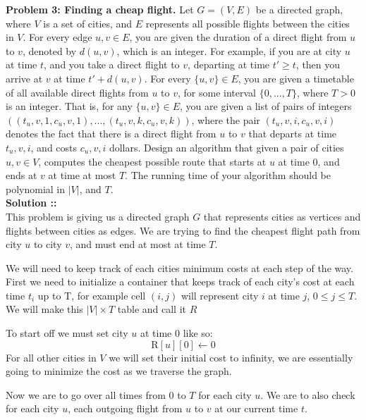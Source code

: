 \documentclass[11pt]{article}
\begin{document}
\pagebreak


\textbf{Problem 3: Finding a cheap flight.} Let $G = (V, E)$ be a directed graph, where
$V$ is a set of cities, and $E$ represents all possible flights between the cities in 
$V$. For every edge ${u, v} \in E$, you are given the duration of a direct flight from 
$u$ to $v$, denoted by $d(u, v)$, which is an integer. For example, if you are at city
$u$ at time $t$, and you take a direct flight to $v$, departing at time $t'\ge t$, then 
you arrive at $v$ at time $t' + d(u, v)$. For every $\{u, v\}\in E$, you are given a 
timetable of all available direct flights from $u$ to $v$, for some interval 
$\{0,...,T\}$, where $T > 0$ is an integer. That is, for any $\{u, v\}\in E$, you are
given a list of pairs of integers $((t_u,v,1, c_u,v,1),...,(t_u,v,k, c_u,v,k))$, where 
the pair $(t_u,v,i, c_u,v,i)$ denotes the fact that there is a direct flight from $u$ to
$v$ that departs at time $t_u,v,i$, and costs $c_u,v,i$ dollars. Design an algorithm
that given a pair of cities $u, v\in V$, computes the cheapest possible route
that starts at $u$ at time 0, and ends at $v$ at time at most $T$. The running time of 
your algorithm should be polynomial in $|V|$, and $T$. \\
\vspace{5px}\textbf{Solution ::} \\
This problem is giving us a directed graph $G$ that represents cities as vertices and
flights between cities as edges. We are trying to find the cheapest flight path
from city $u$ to city $v$, and must end at most at time $T$.

\vspace{10px}We will need to keep track of each cities minimum costs at each step of the way. First we need to initialize a container that keeps track of each city's cost
at each time $t_{i}$ up to T, for example cell $(i, j)$ will represent city $i$ at 
time $j$, $0\le j \le T$. We will make this $|V|\times T$ table and call it $R$

\vspace{10px}To start off we must set city $u$ at time 0 like so:
$$\text{R}[u][0]\gets 0$$
For all other cities in $V$ we will set their initial cost to infinity, we are
essentially going to minimize the cost as we traverse the graph.

\vspace{10px}Now we are to go over all times from $0$ to $T$ for each city $u$.
We are to also check for each city $u$, each outgoing flight from $u$ to $v$ at our
current time $t$.
\end{document}
